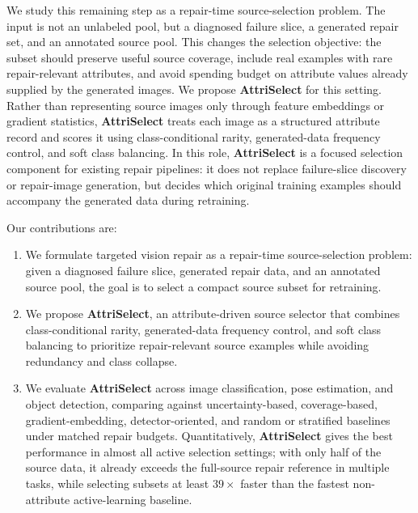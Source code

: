 \documentclass{article}
\newcommand{\modelname}{AttriSelect}
\newcommand{\model}{\textcolor{darkteal}{\textbf{\modelname}}\xspace}
\begin{document}
We study this remaining step as a repair-time source-selection problem. The input is not an unlabeled pool, but a diagnosed failure slice, a generated repair set, and an annotated source pool. This changes the selection objective: the subset should preserve useful source coverage, include real examples with rare repair-relevant attributes, and avoid spending budget on attribute values already supplied by the generated images. We propose \model for this setting. Rather than representing source images only through feature embeddings or gradient statistics, \model treats each image as a structured attribute record and scores it using class-conditional rarity, generated-data frequency control, and soft class balancing. In this role, \model is a focused selection component for existing repair pipelines: it does not replace failure-slice discovery or repair-image generation, but decides which original training examples should accompany the generated data during retraining.

Our contributions are:
\begin{enumerate}
\item We formulate targeted vision repair as a repair-time source-selection problem: given a diagnosed failure slice, generated repair data, and an annotated source pool, the goal is to select a compact source subset for retraining.

\item We propose \model, an attribute-driven source selector that combines class-conditional rarity, generated-data frequency control, and soft class balancing to prioritize repair-relevant source examples while avoiding redundancy and class collapse.


\item We evaluate \model across image classification, pose estimation, and object detection, comparing against uncertainty-based, coverage-based, gradient-embedding, detector-oriented, and random or stratified baselines under matched repair budgets. Quantitatively, \model gives the best performance in almost all active selection settings; with only half of the source data, it already exceeds the full-source repair reference in multiple tasks, while selecting subsets at least $39\times$ faster than the fastest non-attribute active-learning baseline.

\end{enumerate}
\end{document}
